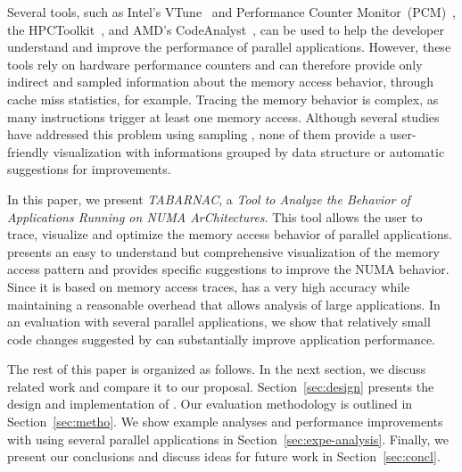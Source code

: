 Several tools, such as Intel's VTune~\cite{Reinders05VTune} and Performance Counter Monitor~(PCM)~\cite{Intel2012b}, the HPCToolkit~\cite{Adhianto10HPCTOOLKIT}, and AMD's CodeAnalyst~\cite{Drongowski2008}, can be used to help the
developer understand and improve the performance of parallel applications.
However, these tools rely on hardware performance counters and can therefore provide only indirect and sampled information about the memory access behavior, through cache miss statistics, for example.
Tracing the memory behavior is complex, as many instructions trigger at least one memory access.
Although several studies have addressed this problem using sampling
\cite{Lachaize12MemProf,McCurdy2010}, none of them provide a user-friendly
visualization with informations grouped by data structure or automatic suggestions for improvements.

In this paper, we present \emph{TABARNAC}, a \emph{Tool to Analyze the Behavior of
Applications Running on NUMA ArChitectures}. This tool allows the user to
trace, visualize and optimize the memory access behavior of parallel applications.
\TABARNAC presents an easy to understand but comprehensive visualization of the memory access pattern and
provides specific suggestions to improve the NUMA behavior.
Since it is based on memory access traces, \TABARNAC has a very high accuracy while maintaining a reasonable overhead that allows analysis of large applications.
In an evaluation with several parallel applications, we show that relatively small code changes suggested by \TABARNAC can substantially improve application performance.

The rest of this paper is organized as follows.
In the next section, we discuss related work and compare it to our proposal.
Section~\ref{sec:design} presents the design and implementation of \TABARNAC.
Our evaluation methodology is outlined in Section~\ref{sec:metho}.
We show example analyses and performance improvements with \TABARNAC using several parallel applications in Section~\ref{sec:expe-analysis}.
Finally, we present our conclusions and discuss ideas for future work in Section~\ref{sec:concl}.

